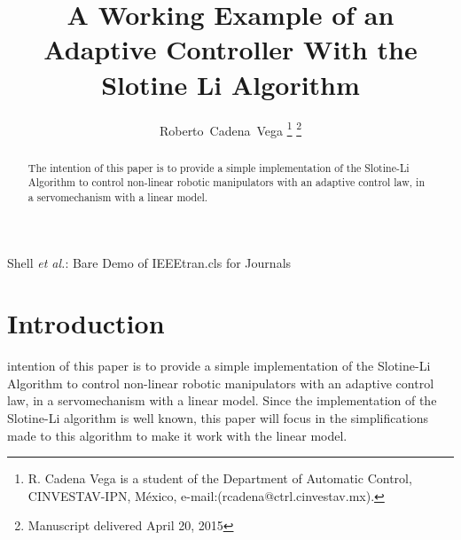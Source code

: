 \documentclass[journal]{IEEEtran}
\begin{document}
%
\title{A Working Example of an Adaptive Controller
    With the Slotine Li Algorithm}

\author{Roberto~Cadena~Vega%
\thanks{R. Cadena Vega is a student of the Department of Automatic Control,
    CINVESTAV-IPN, México, e-mail:(rcadena@ctrl.cinvestav.mx).}%
\thanks{Manuscript delivered April 20, 2015}}

%
{Shell \MakeLowercase{\textit{et al.}}: Bare Demo of IEEEtran.cls for Journals}
% 

\maketitle

\begin{abstract}
    The intention of this paper is to provide a simple implementation of the Slotine-Li Algorithm to control non-linear robotic manipulators with an adaptive control law, in a servomechanism with a linear model.
\end{abstract}

\section{Introduction}

     intention of this paper is to provide a simple implementation of the Slotine-Li Algorithm to control non-linear robotic manipulators with an adaptive control law, in a servomechanism with a linear model. Since the implementation of the Slotine-Li algorithm is well known, this paper will focus in the simplifications made to this algorithm to make it work with the linear model.
\end{document}
